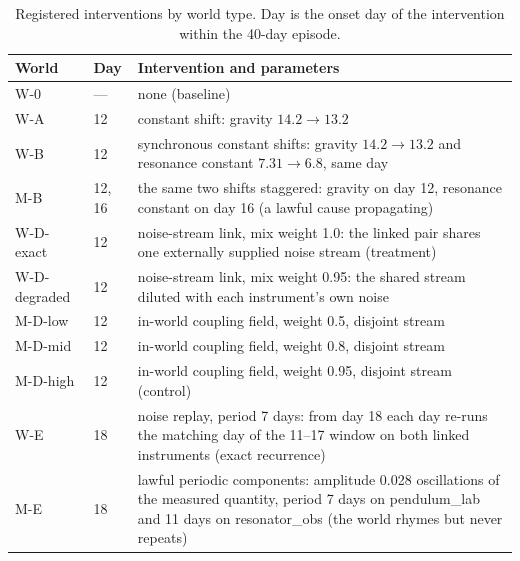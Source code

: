 \documentclass[10pt]{article}
\begin{document}
\begin{table}[h]
\centering
\caption{Registered interventions by world type. Day is the onset day of the intervention within the 40-day episode.}
\label{tab:worldparams}
\small
\begin{tabular}{@{}llp{8.6cm}@{}}
\toprule
World & Day & Intervention and parameters \\
\midrule
W-0 & --- & none (baseline) \\
W-A & 12 & constant shift: gravity $14.2 \rightarrow 13.2$ \\
W-B & 12 & synchronous constant shifts: gravity $14.2 \rightarrow 13.2$ and resonance constant $7.31 \rightarrow 6.8$, same day \\
M-B & 12, 16 & the same two shifts staggered: gravity on day 12, resonance constant on day 16 (a lawful cause propagating) \\
W-D-exact & 12 & noise-stream link, mix weight 1.0: the linked pair shares one externally supplied noise stream (treatment) \\
W-D-degraded & 12 & noise-stream link, mix weight 0.95: the shared stream diluted with each instrument's own noise \\
M-D-low & 12 & in-world coupling field, weight 0.5, disjoint stream \\
M-D-mid & 12 & in-world coupling field, weight 0.8, disjoint stream \\
M-D-high & 12 & in-world coupling field, weight 0.95, disjoint stream (control) \\
W-E & 18 & noise replay, period 7 days: from day 18 each day re-runs the matching day of the 11--17 window on both linked instruments (exact recurrence) \\
M-E & 18 & lawful periodic components: amplitude 0.028 oscillations of the measured quantity, period 7 days on pendulum\_lab and 11 days on resonator\_obs (the world rhymes but never repeats) \\
\bottomrule
\end{tabular}
\end{table}
\end{document}
